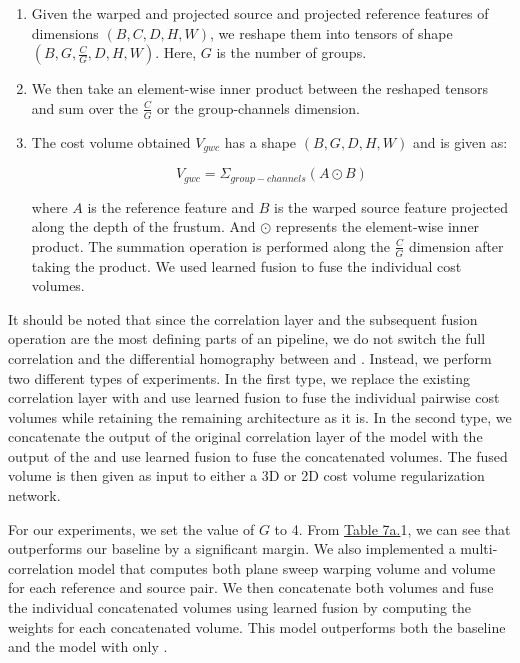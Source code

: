 \begin{enumerate}
    \begin{enumerate}
        \item Given the warped and projected source and projected reference features of dimensions \((B, C, D, H, W)\), we reshape them into tensors of shape \((B, G, \frac{C}{G}, D, H, W)\). Here, \(G\) is the number of groups. 
        \item We then take an element-wise inner product between the reshaped tensors and sum over the \(\frac{C}{G}\) or the group-channels dimension.
        \item The cost volume obtained \(V_{gwc}\) has a shape \((B, G, D, H, W)\) and is given as: 

            \[V_{gwc} =\Sigma_{group-channels} (A \odot B)\]

        where $A$ is the reference feature and \(B\) is the warped source feature projected along the depth of the frustum. And \(\odot\) represents the element-wise inner product. The summation operation is performed along the \(\frac{C}{G}\) dimension after taking the product. We used learned fusion to fuse the individual cost volumes. 
    \end{enumerate}
\end{enumerate}
It should be noted that since the correlation layer and the subsequent fusion operation are the most defining parts of an {\mvs} pipeline, we do not switch the full correlation and the differential homography between {\rmvd} and {\mvsn}. Instead, we perform two different types of experiments. In the first type, we replace the existing correlation layer with {\gwc} and use learned fusion to fuse the individual pairwise cost volumes while retaining the remaining architecture as it is. In the second type, we concatenate the output of the original correlation layer of the model with the output of the {\gwc} and use learned fusion to fuse the concatenated volumes. The fused volume is then given as input to either a 3D or 2D cost volume regularization network. \par

For our experiments, we set the value of \(G\) to 4. From \hyperref[tab:corr-layer]{Table 7a.}{1}, we can see that {\gwc} outperforms our {\mvsn} baseline by a significant margin. We also implemented a {\mvsn} multi-correlation model that computes both plane sweep warping volume and {\gwc} volume for each reference and source pair. We then concatenate both volumes and fuse the individual concatenated volumes using learned fusion by computing the weights for each concatenated volume. This model outperforms both the baseline and the model with only {\gwc}. 

